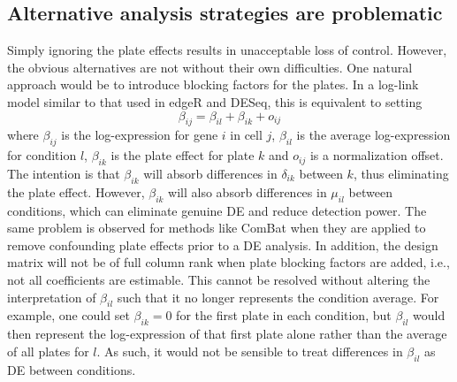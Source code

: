 \documentclass{article}
\begin{document}
\subsection{Alternative analysis strategies are problematic}
Simply ignoring the plate effects results in unacceptable loss of control.
However, the obvious alternatives are not without their own difficulties.
One natural approach would be to introduce blocking factors for the plates.
In a log-link model similar to that used in edgeR and DESeq, this is equivalent to setting
\[
    \beta_{ij} = \beta_{il} + \beta_{ik} + o_{ij}
\]
where $\beta_{ij}$ is the log-expression for gene $i$ in cell $j$, $\beta_{il}$ is the average log-expression for condition $l$, 
    $\beta_{ik}$ is the plate effect for plate $k$ and $o_{ij}$ is a normalization offset.
The intention is that $\beta_{ik}$ will absorb differences in $\delta_{ik}$ between $k$, thus eliminating the plate effect.
However, $\beta_{ik}$ will also absorb differences in $\mu_{il}$ between conditions, which can eliminate genuine DE and reduce detection power.
The same problem is observed for methods like ComBat \cite{johnson2007adjusting} when they are applied to remove confounding plate effects prior to a DE analysis.
In addition, the design matrix will not be of full column rank when plate blocking factors are added, i.e., not all coefficients are estimable.
This cannot be resolved without altering the interpretation of $\beta_{il}$ such that it no longer represents the condition average.
For example, one could set $\beta_{ik}=0$ for the first plate in each condition, 
    but $\beta_{il}$ would then represent the log-expression of that first plate alone rather than the average of all plates for $l$.
As such, it would not be sensible to treat differences in $\beta_{il}$ as DE between conditions.
\end{document}
